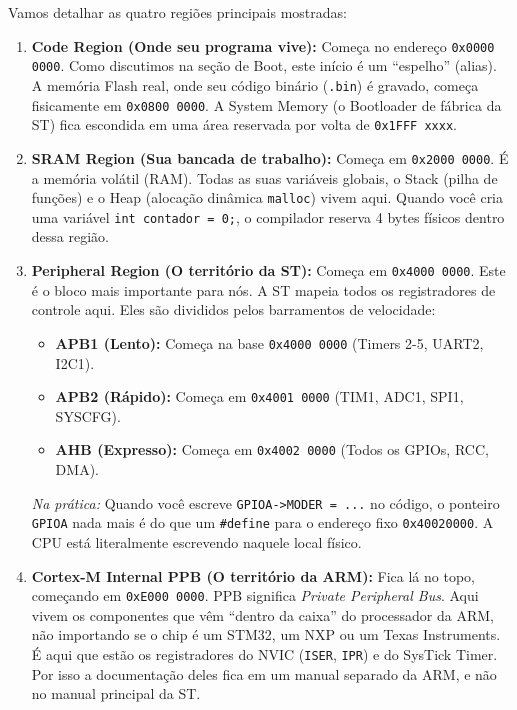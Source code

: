 \documentclass[12pt,a4paper]{article}
\begin{document}
Vamos detalhar as quatro regiões principais mostradas:
\begin{enumerate}
    \item \textbf{Code Region (Onde seu programa vive):} Começa no endereço \texttt{0x0000 0000}. Como discutimos na seção de Boot, este início é um ``espelho'' (alias). A memória Flash real, onde seu código binário (\texttt{.bin}) é gravado, começa fisicamente em \texttt{0x0800 0000}. A System Memory (o Bootloader de fábrica da ST) fica escondida em uma área reservada por volta de \texttt{0x1FFF xxxx}.
    \item \textbf{SRAM Region (Sua bancada de trabalho):} Começa em \texttt{0x2000 0000}. É a memória volátil (RAM). Todas as suas variáveis globais, o Stack (pilha de funções) e o Heap (alocação dinâmica \texttt{malloc}) vivem aqui. Quando você cria uma variável \texttt{int contador = 0;}, o compilador reserva 4 bytes físicos dentro dessa região.
    \item \textbf{Peripheral Region (O território da ST):} Começa em \texttt{0x4000 0000}. Este é o bloco mais importante para nós. A ST mapeia todos os registradores de controle aqui. Eles são divididos pelos barramentos de velocidade:
    \begin{itemize}
        \item \textbf{APB1 (Lento):} Começa na base \texttt{0x4000 0000} (Timers 2-5, UART2, I2C1).
        \item \textbf{APB2 (Rápido):} Começa em \texttt{0x4001 0000} (TIM1, ADC1, SPI1, SYSCFG).
        \item \textbf{AHB (Expresso):} Começa em \texttt{0x4002 0000} (Todos os GPIOs, RCC, DMA).
    \end{itemize}
    \textit{Na prática:} Quando você escreve \texttt{GPIOA->MODER = ...} no código, o ponteiro \texttt{GPIOA} nada mais é do que um \texttt{\#define} para o endereço fixo \texttt{0x40020000}. A CPU está literalmente escrevendo naquele local físico.
    \item \textbf{Cortex-M Internal PPB (O território da ARM):} Fica lá no topo, começando em \texttt{0xE000 0000}. PPB significa \textit{Private Peripheral Bus}. Aqui vivem os componentes que vêm ``dentro da caixa'' do processador da ARM, não importando se o chip é um STM32, um NXP ou um Texas Instruments. É aqui que estão os registradores do NVIC (\texttt{ISER}, \texttt{IPR}) e do SysTick Timer. Por isso a documentação deles fica em um manual separado da ARM, e não no manual principal da ST.
\end{enumerate}
\end{document}
